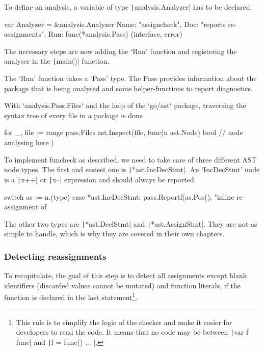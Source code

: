 To define an analysis, a variable of type \texttt|analysis.Analyzer| has to be declared:

\begin{gocode}
var Analyzer = &analysis.Analyzer{
	Name: "assigncheck",
	Doc:  "reports re-assignments",
	Run:  func(*analysis.Pass) (interface{}, error)
}
\end{gocode}

The necessary steps are now adding the `Run' function and registering the analyser
in the \texttt|main()| function.

The `Run' function takes a `Pass' type. The Pass provides information about the package
that is being analysed and some helper-functions to report diagnostics.

With `analysis.Pass.Files` and the help of the `go/ast` package, traversing the syntax
tree of every file in a package is done %

\begin{gocode}
for _, file := range pass.Files {
	ast.Inspect(file, func(n ast.Node) bool {
		// node analysing here
	})
}
\end{gocode}

To implement funcheck as described, we need to %
take care of three different AST node types. The first and easiest one is
\texttt|*ast.IncDecStmt|. An `IncDecStmt' node is a \texttt|x++|
or \texttt|x--| expression and should always be reported.

\begin{gocode}
switch as := n.(type) {
case *ast.IncDecStmt:
	pass.Reportf(as.Pos(), "inline re-assignment of %
}
\end{gocode}

The other two types are \texttt|*ast.DeclStmt| and \texttt|*ast.AssignStmt|.
They are not as simple to handle, which is why they are covered in their own chapters.

\subsubsection{Detecting reassignments}

To recapitulate, the goal of this step is to detect all assignments except blank identifiers
(discarded values cannot be mutated) and function literals, if the function is declared in the
last statement\footnote{This rule is to simplify the logic of the checker and make it easier
    for developers to read the code. It means that no code may be between \texttt|var f func|
and \texttt|f = func() { ... }|.}.


